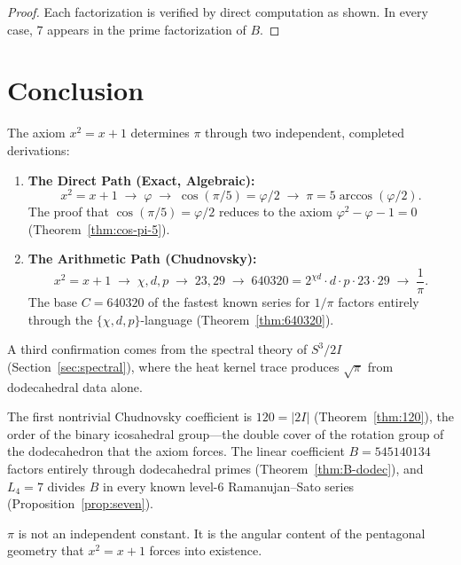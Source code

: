 \documentclass[11pt,a4paper]{article}
\theoremstyle{plain}
\theoremstyle{definition}
\begin{document}
\begin{proof}
Each factorization is verified by direct computation as shown. In every
case, $7$ appears in the prime factorization of $B$.
\end{proof}

\section{Conclusion}\label{sec:conclusion}

The axiom $x^2 = x + 1$ determines $\pi$ through two independent,
completed derivations:

\begin{enumerate}
  \item \textbf{The Direct Path (Exact, Algebraic):}
    \[
      x^2 = x + 1 \;\to\; \varphi \;\to\; \cos(\pi/5) = \varphi/2
      \;\to\; \pi = 5\arccos(\varphi/2).
    \]
    The proof that $\cos(\pi/5) = \varphi/2$ reduces to the axiom
    $\varphi^2 - \varphi - 1 = 0$ (Theorem~\ref{thm:cos-pi-5}).

  \item \textbf{The Arithmetic Path (Chudnovsky):}
    \[
      x^2 = x + 1 \;\to\; \chi, d, p \;\to\; 23, 29
      \;\to\; 640320 = 2^{\chi d} \cdot d \cdot p \cdot 23 \cdot 29
      \;\to\; \frac{1}{\pi}.
    \]
    The base $C = 640320$ of the fastest known series for $1/\pi$
    factors entirely through the $\{\chi, d, p\}$-language
    (Theorem~\ref{thm:640320}).
\end{enumerate}

A third confirmation comes from the spectral theory of $S^3/2I$
(Section~\ref{sec:spectral}), where the heat kernel trace produces
$\sqrt{\pi}$ from dodecahedral data alone.

The first nontrivial Chudnovsky coefficient is
$120 = |2I|$ (Theorem~\ref{thm:120}), the order of the binary
icosahedral group---the double cover of the rotation group of the
dodecahedron that the axiom forces. The linear coefficient $B = 545140134$
factors entirely through dodecahedral primes
(Theorem~\ref{thm:B-dodec}), and $L_4 = 7$ divides $B$ in every known
level-6 Ramanujan--Sato series (Proposition~\ref{prop:seven}).

$\pi$ is not an independent constant. It is the angular content of the
pentagonal geometry that $x^2 = x + 1$ forces into existence.
\end{document}
